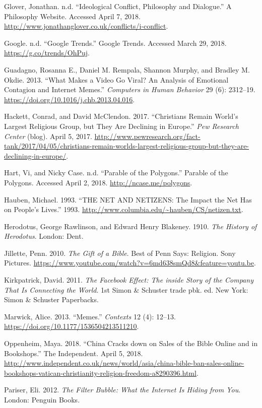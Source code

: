 \documentclass[]{article}
\begin{document}
Glover, Jonathan. n.d. ``Ideological Conflict, Philosophy and
Dialogue.'' A Philosophy Website. Accessed April 7, 2018.
\url{http://www.jonathanglover.co.uk/conflicts/i-conflict}.

Google. n.d. ``Google Trends.'' Google Trends. Accessed March 29, 2018.
\url{https://g.co/trends/OhPuj}.

Guadagno, Rosanna E., Daniel M. Rempala, Shannon Murphy, and Bradley M.
Okdie. 2013. ``What Makes a Video Go Viral? An Analysis of Emotional
Contagion and Internet Memes.'' \emph{Computers in Human Behavior} 29
(6): 2312--19. \url{https://doi.org/10.1016/j.chb.2013.04.016}.

Hackett, Conrad, and David McClendon. 2017. ``Christians Remain World's
Largest Religious Group, but They Are Declining in Europe.'' \emph{Pew
Research Center} (blog). April 5, 2017.
\url{http://www.pewresearch.org/fact-tank/2017/04/05/christians-remain-worlds-largest-religious-group-but-they-are-declining-in-europe/}.

Hart, Vi, and Nicky Case. n.d. ``Parable of the Polygons.'' Parable of
the Polygons. Accessed April 2, 2018. \url{http://ncase.me/polygons}.

Hauben, Michael. 1993. ``THE NET AND NETIZENS: The Impact the Net Has on
People's Lives.'' 1993.
\url{http://www.columbia.edu/~hauben/CS/netizen.txt}.

Herodotus, George Rawlinson, and Edward Henry Blakeney. 1910. \emph{The
History of Herodotus}. London: Dent.

Jillette, Penn. 2010. \emph{The Gift of a Bible}. Best of Penn Says:
Religion. Sony Pictures.
\url{https://www.youtube.com/watch?v=6md638smQd8\&feature=youtu.be}.

Kirkpatrick, David. 2011. \emph{The Facebook Effect: The inside Story of
the Company That Is Connecting the World}. 1st Simon \& Schuster trade
pbk. ed. New York: Simon \& Schuster Paperbacks.

Marwick, Alice. 2013. ``Memes.'' \emph{Contexts} 12 (4): 12--13.
\url{https://doi.org/10.1177/1536504213511210}.

Oppenheim, Maya. 2018. ``China Cracks down on Sales of the Bible Online
and in Bookshops.'' The Independent. April 5, 2018.
\url{http://www.independent.co.uk/news/world/asia/china-bible-ban-sales-online-bookshops-vatican-christianity-religion-freedom-a8290396.html}.

Pariser, Eli. 2012. \emph{The Filter Bubble: What the Internet Is Hiding
from You}. London: Penguin Books.
\end{document}
